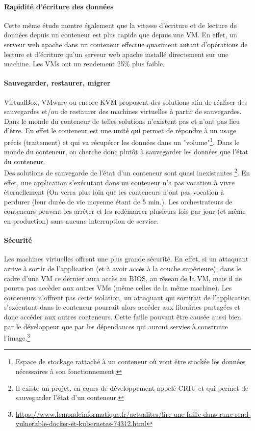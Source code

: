 \documentclass[11pt,fleqn]{book} %
\begin{document}
\paragraph{Rapidité d'écriture des données}
Cette même étude montre également que la vitesse d'écriture et de lecture de données depuis un conteneur est plus rapide que depuis une VM. En effet, un serveur web apache dans un conteneur effectue quasiment autant d'opérations de lecture et d'écriture qu'un serveur web apache installé directement sur une machine. Les VMs ont un rendement 25\% plus faible. 

\paragraph{Sauvegarder, restaurer, migrer}
VirtualBox, VMware ou encore KVM proposent des solutions afin de réaliser des sauvegardes et/ou de restaurer des machines virtuelles à partir de sauvegardes.\\

Dans le monde du conteneur de telles solutions n'existent pas et n'ont pas lieu d'être. En effet le conteneur est une unité qui permet de répondre à un usage précis (traitement) et qui va récupérer les données dans un "volume"\footnote{Espace de stockage rattaché à un conteneur où vont être stockée les données nécessaires à son fonctionnement.}. Dans le monde du conteneur, on cherche donc plutôt à sauvegarder les données que l'état du conteneur.\\  

Des solutions de sauvegarde de l'état d'un conteneur sont quasi inexistantes \footnote{Il existe un projet, en cours de développement appelé CRIU et qui permet de sauvegarder l'état d'un conteneur.}. En effet, une application s'exécutant dans un conteneur n'a pas vocation à vivre éternellement (On verra plus loin que les conteneurs n'ont pas vocation à perdurer (leur durée de vie moyenne étant de 5 min.). Les orchestrateurs de conteneurs peuvent les arrêter et les redémarrer plusieurs fois par jour (et même en production) sans aucune interruption de service.

\paragraph{Sécurité}
Les machines virtuelles offrent une plus grande sécurité. En effet, si un attaquant arrive à sortir de l'application (et à avoir accès à la couche supérieure), dans le cadre d'une VM ce dernier aura accès au BIOS, au réseau de la VM, mais il ne pourra pas accèder aux autres VMs (même celles de la même machine). Les conteneurs n'offrent pas cette isolation, un attaquant qui sortirait de l'application s'exécutant dans le conteneur pourrait alors accéder aux librairies partagées et donc accéder aux autres conteneurs. Cette faille pouvant être causée aussi bien par le développeur que par les dépendances qui auront servies à construire l'image.\footnote{\url{https://www.lemondeinformatique.fr/actualites/lire-une-faille-dans-runc-rend-vulnerable-docker-et-kubernetes-74312.html}} 
\end{document}

